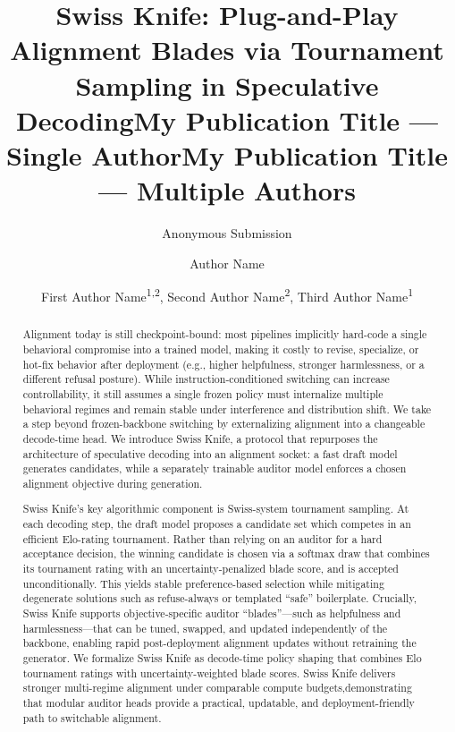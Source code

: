 \documentclass[letterpaper]{article} %
\title{Swiss Knife: Plug-and-Play Alignment Blades via Tournament Sampling in Speculative Decoding}
\author{
    Anonymous Submission
}
\title{My Publication Title --- Single Author}
\author {
    Author Name
}
\title{My Publication Title --- Multiple Authors}
\author {
    First Author Name\textsuperscript{\rm 1,\rm 2}\equalcontrib,
    Second Author Name\textsuperscript{\rm 2}\equalcontrib,
    Third Author Name\textsuperscript{\rm 1}\corresponding
}
\begin{document}
\maketitle

\begin{abstract}
Alignment today is still checkpoint-bound: most pipelines implicitly hard-code a single behavioral compromise into a trained model, making it costly to revise, specialize, or hot-fix behavior after deployment (e.g., higher helpfulness, stronger harmlessness, or a different refusal posture). While instruction-conditioned switching can increase controllability, it still assumes a single frozen policy must internalize multiple behavioral regimes and remain stable under interference and distribution shift. We take a step beyond frozen-backbone switching by externalizing alignment into a changeable decode-time head. We introduce Swiss Knife, a protocol that repurposes the architecture of speculative decoding into an alignment socket: a fast draft model generates candidates, while a separately trainable auditor model enforces a chosen alignment objective during generation.

Swiss Knife's key algorithmic component is Swiss-system tournament sampling. At each decoding step, the draft model proposes a candidate set which competes in an efficient Elo-rating tournament. Rather than relying on an auditor for a hard acceptance decision, the winning candidate is chosen via a softmax draw that combines its tournament rating with an uncertainty-penalized blade score, and is accepted unconditionally. This yields stable preference-based selection while mitigating degenerate solutions such as refuse-always or templated ``safe'' boilerplate. Crucially, Swiss Knife supports objective-specific auditor ``blades''---such as helpfulness and harmlessness---that can be tuned, swapped, and updated independently of the backbone, enabling rapid post-deployment alignment updates without retraining the generator. We formalize Swiss Knife as decode-time policy shaping that combines Elo tournament ratings with uncertainty-weighted blade scores. Swiss Knife delivers stronger multi-regime alignment under comparable compute budgets,demonstrating that modular auditor heads provide a practical, updatable, and deployment-friendly path to switchable alignment.
\end{abstract}

\begin{links}
\end{links}
\end{document}
